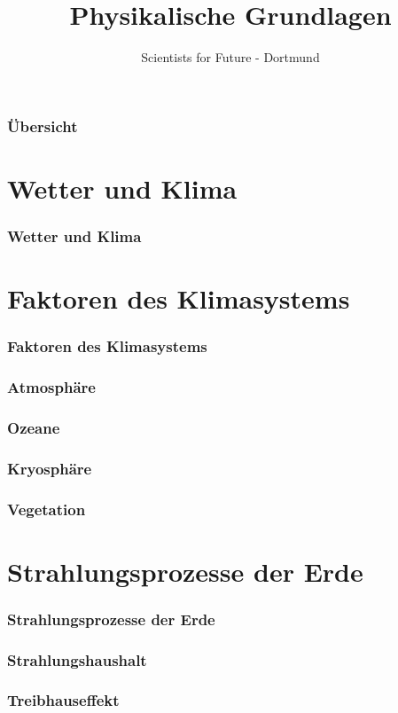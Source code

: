 \documentclass[11pt]{beamer}
\author{Scientists for Future - Dortmund}
\title{Physikalische Grundlagen}
\begin{document}
	
	\begin{frame}[plain]
		\maketitle
	\end{frame}

	\begin{frame}
		\frametitle{Übersicht}
		\tableofcontents
	\end{frame}

	
	\section{Wetter und Klima}
	
	\begin{frame}
		\frametitle{Wetter und Klima}
	\end{frame}

	
	\section{Faktoren des Klimasystems}
	
	\begin{frame}
		\frametitle{Faktoren des Klimasystems}
	\end{frame}
	
	\begin{frame}
		\frametitle{Atmosphäre}
	\end{frame}
	
	\begin{frame}
		\frametitle{Ozeane}
	\end{frame}

	\begin{frame}
		\frametitle{Kryosphäre} %
	\end{frame}
	
	\begin{frame}
		\frametitle{Vegetation}
	\end{frame}
	
	
	\section{Strahlungsprozesse der Erde}
	
	\begin{frame}
		\frametitle{Strahlungsprozesse der Erde}
	\end{frame}

	\begin{frame}
		\frametitle{Strahlungshaushalt}
	\end{frame}

	\begin{frame}
		\frametitle{Treibhauseffekt}
	\end{frame}
\end{document}
